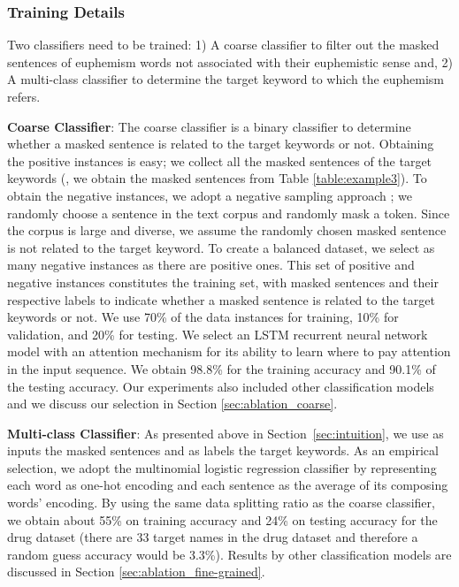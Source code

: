 \subsubsection{Training Details}
\label{sec:iden_approach}
Two classifiers need to be trained: 1) A coarse classifier to filter out the masked sentences of euphemism words not associated with their euphemistic sense
and, 2) A multi-class classifier to determine the target keyword to which the euphemism refers. 

\noindent \textbf{Coarse Classifier}: 
The coarse classifier is a binary classifier to determine whether a masked sentence is related to the target keywords or not. 
Obtaining the positive instances is easy; we collect all the masked sentences of the target keywords (\eg, we obtain the masked sentences from Table \ref{table:example3}). 
To obtain the negative instances, we adopt a negative sampling approach \cite{mikolov2013distributed}; 
we randomly choose a sentence in the text corpus and randomly mask a token. 
Since the corpus is large and diverse, we assume the randomly chosen masked sentence is not related to the target keyword. 
To create a balanced dataset, we select as many negative instances as there are positive ones. 
This set of positive and negative instances constitutes the training set, with masked sentences and their respective labels to indicate whether a masked sentence is related to the target keywords or not. 
We use 70\% of the data instances for training, 10\% for validation, and 20\% for testing. 
We select an LSTM recurrent neural network model \cite{hochreiter1997long} with an attention mechanism \cite{bahdanau2015neural} for its ability to learn where to pay attention in the input sequence. 
We obtain 98.8\% for the training accuracy and 90.1\% of the testing accuracy. 
Our experiments also included other classification models and we discuss our selection in Section \ref{sec:ablation_coarse}. 

\noindent \textbf{Multi-class Classifier}:
As presented above in Section~\ref{sec:intuition}, we use as inputs the masked sentences and as labels the target keywords. 
As an empirical selection, we adopt the multinomial logistic regression classifier \cite{hosmer2013applied} by representing each word as one-hot encoding and each sentence as the average of its composing words' encoding. 
By using the same data splitting ratio as the coarse classifier, we obtain about 55\% on training accuracy and 24\% on testing accuracy for the drug dataset (there are 33 target names in the drug dataset and therefore a random guess accuracy would be 3.3\%). 
Results by other classification models are discussed in Section \ref{sec:ablation_fine-grained}. 

